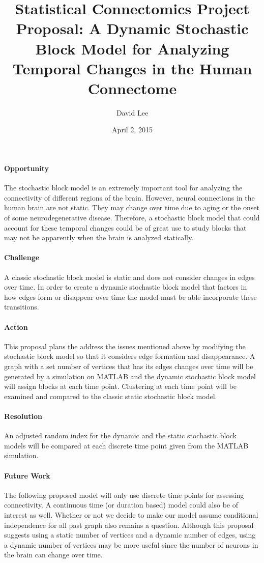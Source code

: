 \documentclass[12pt]{article}
\title{Statistical Connectomics Project Proposal: A Dynamic Stochastic Block Model for Analyzing Temporal Changes in the Human Connectome}
\author{David Lee}
\date{April 2, 2015}
\begin{document}
\maketitle
\paragraph{Opportunity}
The stochastic block model is an extremely important tool for analyzing the connectivity of different regions of the brain.  However, neural connections in the human brain are not static.  They may change over time due to aging or the onset of some neurodegenerative disease.  Therefore, a stochastic block model that could account for these temporal changes could be of great use to study blocks that may not be apparently when the brain is analyzed statically.

\paragraph{Challenge}
A classic stochastic block model is static and does not consider changes in edges over time.  In order to create a dynamic stochastic block model that factors in how edges form or disappear over time the model must be able incorporate these transitions.

\paragraph{Action}
This proposal plans the address the issues mentioned above by modifying the stochastic block model so that it considers edge formation and disappearance.  A graph with a set number of vertices that has its edges changes over time will be generated by a simulation on MATLAB and the dynamic stochastic block model will assign blocks at each time point.  Clustering at each time point will be examined and compared to the classic static stochastic block model.

\paragraph{Resolution}
An adjusted random index for the dynamic and the static stochastic block models will be compared at each discrete time point given from the MATLAB simulation.

\paragraph{Future Work}
The following proposed model will only use discrete time points for assessing connectivity.  A continuous time (or duration based) model could also be of interest as well.  Whether or not we decide to make our model assume conditional independence for all past graph also remains a question.  Although this proposal suggests using a static number of vertices and a dynamic number of edges, using a dynamic number of vertices may be more useful since the number of neurons in the brain can change over time.
\end{document}
